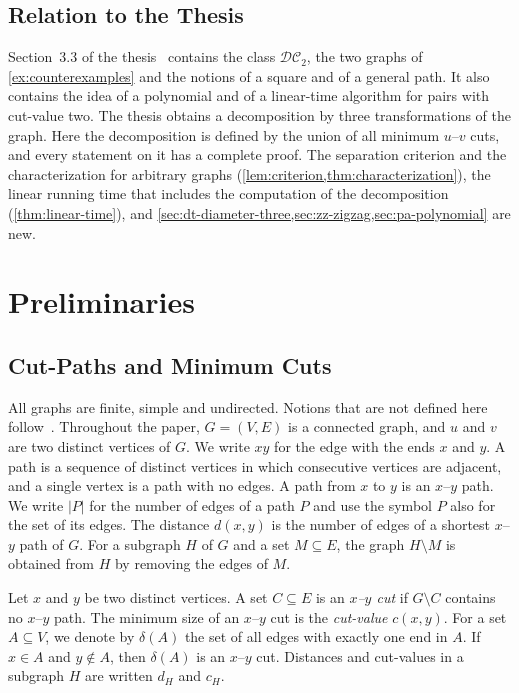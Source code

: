 \documentclass[pdflatex,sn-mathphys-num]{sn-jnl}%
\theoremstyle{thmstyleone}%
\theoremstyle{thmstyletwo}%
\theoremstyle{thmstylethree}%
\newcommand{\DC}{\mathcal{DC}_2}%
\begin{document}
\subsection{Relation to the Thesis}\label{sec:thesis}

Section~3.3 of the thesis~\cite[Definitions~37 to~40 and Theorems~20, 22 and~23]{Michel2025MinCutPath} contains the class $\DC$, the two graphs of \cref{ex:counterexamples} and the notions of a square and of a general path.
It also contains the idea of a polynomial and of a linear-time algorithm for pairs with cut-value two.
The thesis obtains a decomposition by three transformations of the graph.
Here the decomposition is defined by the union of all minimum $u$--$v$ cuts, and every statement on it has a complete proof.
The separation criterion and the characterization for arbitrary graphs (\cref{lem:criterion,thm:characterization}), the linear running time that includes the computation of the decomposition (\cref{thm:linear-time}), and \cref{sec:dt-diameter-three,sec:zz-zigzag,sec:pa-polynomial} are new.

\section{Preliminaries}
\label{sec:preliminaries}

\subsection{Cut-Paths and Minimum Cuts}
\label{sec:cut-paths}

All graphs are finite, simple and undirected.
Notions that are not defined here follow~\cite{Diestel2025}.
Throughout the paper, $G = (V, E)$ is a connected graph, and $u$ and $v$ are two distinct vertices of $G$.
We write $xy$ for the edge with the ends $x$ and $y$.
A path is a sequence of distinct vertices in which consecutive vertices are adjacent, and a single vertex is a path with no edges.
A path from $x$ to $y$ is an $x$--$y$ path.
We write $|P|$ for the number of edges of a path $P$ and use the symbol $P$ also for the set of its edges.
The distance $d(x, y)$ is the number of edges of a shortest $x$--$y$ path of $G$.
For a subgraph $H$ of $G$ and a set $M \subseteq E$, the graph $H \setminus M$ is obtained from $H$ by removing the edges of $M$.

Let $x$ and $y$ be two distinct vertices.
A set $C \subseteq E$ is an \emph{$x$--$y$ cut} if $G \setminus C$ contains no $x$--$y$ path.
The minimum size of an $x$--$y$ cut is the \emph{cut-value} $c(x, y)$.
For a set $A \subseteq V$, we denote by $\delta(A)$ the set of all edges with exactly one end in $A$.
If $x \in A$ and $y \notin A$, then $\delta(A)$ is an $x$--$y$ cut.
Distances and cut-values in a subgraph $H$ are written $d_H$ and $c_H$.
\end{document}
